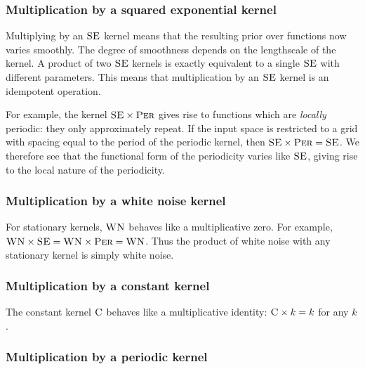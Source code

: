 \documentclass{article} %
\def\ie{i.e.\ }
\begin{document}
\subsubsection{Multiplication by a squared exponential kernel}
\vspace{-0.08in}

Multiplying by an ${\textsc{SE}}$ kernel means that the resulting prior over functions now varies smoothly.
The degree of smoothness depends on the lengthscale of the kernel.
A product of two ${\textsc{SE}}$ kernels is exactly equivalent to a single ${\textsc{SE}}$ with different parameters.
This means that multiplication by an ${\textsc{SE}}$ kernel is an idempotent operation.  

For example,
the kernel ${\textsc{SE}} \times {\textsc{Per}}$ gives rise to functions which are \emph{locally} periodic: they only approximately repeat.
If the input space is restricted to a grid with spacing equal to the period of the periodic kernel, then ${\textsc{SE}} \times {\textsc{Per}} = {\textsc{SE}}$.
We therefore see that the functional form of the periodicity varies like ${\textsc{SE}}$, giving rise to the local nature of the periodicity.


\subsubsection{Multiplication by a white noise kernel}
\vspace{-0.08in}

For stationary kernels, ${\textsc{WN}}$ behaves like a multiplicative zero.
For example, ${\textsc{WN}} \times {\textsc{SE}} = {\textsc{WN}} \times {\textsc{Per}} = {\textsc{WN}}$.
Thus the product of white noise with any stationary kernel is simply white noise.


\subsubsection{Multiplication by a constant kernel}
\vspace{-0.08in}

The constant kernel ${\textsc{C}}$ behaves like a multiplicative identity: ${\textsc{C}} \times k = k$ for any $k$.


\subsubsection{Multiplication by a periodic kernel}
\vspace{-0.08in}
\end{document}
